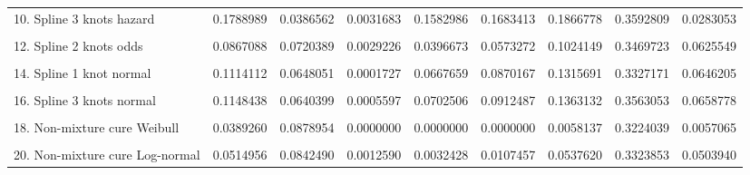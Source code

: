 \documentclass[
]{article}
\begin{document}
\begin{table}
{\begin{tabular}[t]{lrrrrrrrr}
10. Spline 3 knots hazard & 0.1788989 & 0.0386562 & 0.0031683 & 0.1582986 & 0.1683413 & 0.1866778 & 0.3592809 & 0.0283053\\
\cellcolor{gray!6}{11. Spline 1 knot odds} & \cellcolor{gray!6}{0.0828357} & \cellcolor{gray!6}{0.0722699} & \cellcolor{gray!6}{0.0040178} & \cellcolor{gray!6}{0.0370403} & \cellcolor{gray!6}{0.0534922} & \cellcolor{gray!6}{0.0956137} & \cellcolor{gray!6}{0.3493212} & \cellcolor{gray!6}{0.0583928}\\
12. Spline 2 knots odds & 0.0867088 & 0.0720389 & 0.0029226 & 0.0396673 & 0.0573272 & 0.1024149 & 0.3469723 & 0.0625549\\
\cellcolor{gray!6}{13. Spline 3 knots odds} & \cellcolor{gray!6}{0.0928689} & \cellcolor{gray!6}{0.0716713} & \cellcolor{gray!6}{0.0030333} & \cellcolor{gray!6}{0.0440122} & \cellcolor{gray!6}{0.0636685} & \cellcolor{gray!6}{0.1136219} & \cellcolor{gray!6}{0.3540585} & \cellcolor{gray!6}{0.0693973}\\
14. Spline 1 knot normal & 0.1114112 & 0.0648051 & 0.0001727 & 0.0667659 & 0.0870167 & 0.1315691 & 0.3327171 & 0.0646205\\
\cellcolor{gray!6}{15. Spline 2 knots normal} & \cellcolor{gray!6}{0.1011183} & \cellcolor{gray!6}{0.0666081} & \cellcolor{gray!6}{0.0003302} & \cellcolor{gray!6}{0.0575252} & \cellcolor{gray!6}{0.0758011} & \cellcolor{gray!6}{0.1164212} & \cellcolor{gray!6}{0.3361383} & \cellcolor{gray!6}{0.0587268}\\
16. Spline 3 knots normal & 0.1148438 & 0.0640399 & 0.0005597 & 0.0702506 & 0.0912487 & 0.1363132 & 0.3563053 & 0.0658778\\
\cellcolor{gray!6}{17. Mixture cure Weibull} & \cellcolor{gray!6}{0.0374953} & \cellcolor{gray!6}{0.0871122} & \cellcolor{gray!6}{0.0000000} & \cellcolor{gray!6}{0.0000000} & \cellcolor{gray!6}{0.0000000} & \cellcolor{gray!6}{0.0019526} & \cellcolor{gray!6}{0.3124571} & \cellcolor{gray!6}{0.0019062}\\
18. Non-mixture cure Weibull & 0.0389260 & 0.0878954 & 0.0000000 & 0.0000000 & 0.0000000 & 0.0058137 & 0.3224039 & 0.0057065\\
\cellcolor{gray!6}{19. Mixture cure Log-normal} & \cellcolor{gray!6}{0.0496395} & \cellcolor{gray!6}{0.0871508} & \cellcolor{gray!6}{0.0002039} & \cellcolor{gray!6}{0.0008353} & \cellcolor{gray!6}{0.0048810} & \cellcolor{gray!6}{0.0495432} & \cellcolor{gray!6}{0.3220204} & \cellcolor{gray!6}{0.0484359}\\
20. Non-mixture cure Log-normal & 0.0514956 & 0.0842490 & 0.0012590 & 0.0032428 & 0.0107457 & 0.0537620 & 0.3323853 & 0.0503940\\

\end{tabular}}
\end{table}
\end{document}
